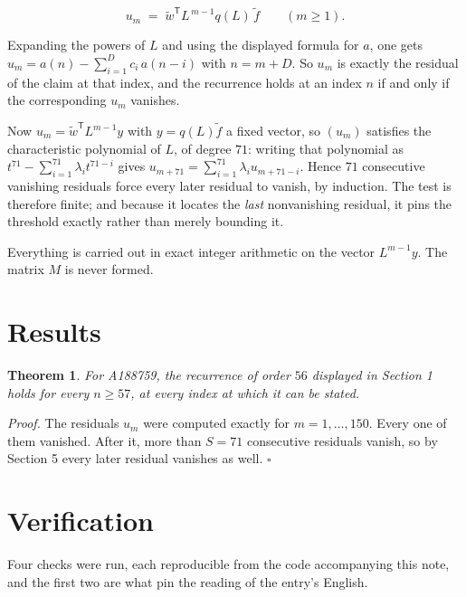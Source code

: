 \documentclass[11pt]{article}
\newtheorem{theorem}{Theorem}
\theoremstyle{definition}
\begin{document}
\[u_m \;=\; \tilde w^{\mathsf T} L^{\,m-1} q(L)\,\tilde f \qquad (m \ge 1).\]

Expanding the powers of $L$ and using the displayed formula for $a$, one gets $u_m = a(n) - \sum_{i=1}^{D} c_i\,a(n-i)$ with $n = m + D$. So $u_m$ is exactly the residual of the claim at that index, and the recurrence holds at an index $n$ if and only if the corresponding $u_m$ vanishes.

Now $u_m = \tilde w^{\mathsf T} L^{m-1} y$ with $y = q(L)\tilde f$ a fixed vector, so $(u_m)$ satisfies the characteristic polynomial of $L$, of degree $71$: writing that polynomial as $t^{71} - \sum_{i=1}^{71} \lambda_i t^{71-i}$ gives $u_{m+71} = \sum_{i=1}^{71} \lambda_i u_{m+71-i}$. Hence $71$ consecutive vanishing residuals force every later residual to vanish, by induction. The test is therefore finite; and because it locates the {\itshape last} nonvanishing residual, it pins the threshold exactly rather than merely bounding it.

Everything is carried out in exact integer arithmetic on the vector $L^{m-1}y$. The matrix $M$ is never formed.

\section{Results}

\begin{theorem} For A188759, the recurrence of order $56$ displayed in Section 1 holds for every $n \ge 57$, at every index at which it can be stated.\end{theorem}

{\itshape Proof.} The residuals $u_m$ were computed exactly for $m = 1,\dots,150$. Every one of them vanished. After it, more than $S = 71$ consecutive residuals vanish, so by Section 5 every later residual vanishes as well. $\square$

\section{Verification}

Four checks were run, each reproducible from the code accompanying this note, and the first two are what pin the reading of the entry's English.
\end{document}
